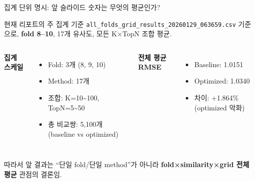 \documentclass[aspectratio=169,10pt]{beamer}
\begin{document}
\begin{frame}{집계 단위 명시: 앞 슬라이드 숫자는 무엇의 평균인가?}
	\begin{block}{현재 리포트의 주 집계 기준}
		\texttt{all\_folds\_grid\_results\_20260129\_063659.csv} 기준으로,
		\textbf{fold 8--10}, 17개 유사도, 모든 K×TopN 조합 평균.
	\end{block}

	\vspace{0.4em}
	\begin{columns}[T]
			\textbf{집계 스케일}
			\begin{itemize}
				\item Fold: 3개 (8, 9, 10)
				\item Method: 17개
				\item 조합: K=10\textasciitilde100, TopN=5\textasciitilde50
				\item 총 비교쌍: 5,100개 (baseline vs optimized)
			\end{itemize}

			\textbf{전체 평균 RMSE}
			\begin{itemize}
				\item Baseline: 1.0151
				\item Optimized: 1.0340
				\item 차이: +1.864\% (optimized 악화)
			\end{itemize}
	\end{columns}

	\vspace{0.3em}
	{\small 따라서 앞 결과는 ``단일 fold/단일 method''가 아니라
	\textbf{fold×similarity×grid 전체 평균} 관점의 결론임.}
\end{frame}
\end{document}
